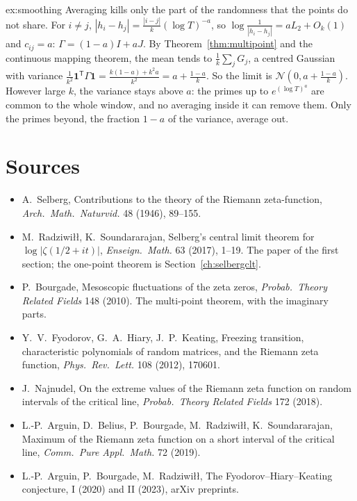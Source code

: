 \begin{solution}{ex:smoothing}
\idea Averaging kills only the part of the randomness that the points do not share.
\writeup For $i\ne j$, $|h_i-h_j|=\frac{|i-j|}k(\log T)^{-a}$, so $\log\frac1{|h_i-h_j|}=aL_2+O_k(1)$ and $c_{ij}=a$: $\Gamma=(1-a)I+aJ$. By Theorem~\ref{thm:multipoint} and the continuous mapping theorem, the mean tends to $\frac1k\sum_jG_j$, a centred Gaussian with variance $\frac1{k^2}\mathbf 1^{\mathsf T}\Gamma\mathbf 1=\frac{k(1-a)+k^2a}{k^2}=a+\frac{1-a}k$. So the limit is $\mathcal N(0,a+\frac{1-a}k)$. However large $k$, the variance stays above $a$: the primes up to $e^{(\log T)^a}$ are common to the whole window, and no averaging inside it can remove them. Only the primes beyond, the fraction $1-a$ of the variance, average out.
\end{solution}

\section{Sources}

\begin{itemize}
\item A.~Selberg, Contributions to the theory of the Riemann zeta-function, \emph{Arch.\ Math.\ Naturvid.} 48 (1946), 89--155.
\item M.~Radziwi\l\l, K.~Soundararajan, Selberg's central limit theorem for $\log|\zeta(1/2+it)|$, \emph{Enseign.\ Math.} 63 (2017), 1--19. The paper of the first section; the one-point theorem is Section~\ref{ch:selbergclt}.
\item P.~Bourgade, Mesoscopic fluctuations of the zeta zeros, \emph{Probab.\ Theory Related Fields} 148 (2010). The multi-point theorem, with the imaginary parts.
\item Y.~V.~Fyodorov, G.~A.~Hiary, J.~P.~Keating, Freezing transition, characteristic polynomials of random matrices, and the Riemann zeta function, \emph{Phys.\ Rev.\ Lett.} 108 (2012), 170601.
\item J.~Najnudel, On the extreme values of the Riemann zeta function on random intervals of the critical line, \emph{Probab.\ Theory Related Fields} 172 (2018).
\item L.-P.~Arguin, D.~Belius, P.~Bourgade, M.~Radziwi\l\l, K.~Soundararajan, Maximum of the Riemann zeta function on a short interval of the critical line, \emph{Comm.\ Pure Appl.\ Math.} 72 (2019).
\item L.-P.~Arguin, P.~Bourgade, M.~Radziwi\l\l, The Fyodorov--Hiary--Keating conjecture, I (2020) and II (2023), arXiv preprints.
\end{itemize}
